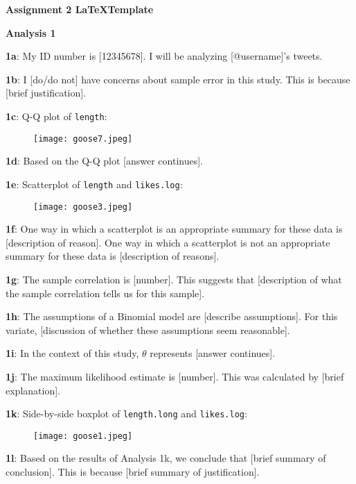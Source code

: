 \documentclass[a4paper,12pt]{article}
\begin{document}
\textbf{Assignment 2 \LaTeX Template}\bigskip

\textbf{Analysis 1}\bigskip

\textbf{1a}: My ID number is [12345678]. I will be analyzing [@username]'s tweets.\bigskip

\textbf{1b}: I [do/do not] have concerns about sample error in this study. This is because [brief justification].\bigskip

\textbf{1c}: Q-Q plot of \texttt{length}:

\begin{figure}[H]
     \centering
     \texttt{[image: goose7.jpeg]}
\end{figure}

\textbf{1d}: Based on the Q-Q plot [answer continues].\bigskip

\textbf{1e}: Scatterplot of \texttt{length} and \texttt{likes.log}:

\begin{figure}[H]
     \centering
     \texttt{[image: goose3.jpeg]}
\end{figure}

\textbf{1f}: One way in which a scatterplot is an appropriate summary for these data is [description of reason]. One way in which a scatterplot is not an appropriate summary for these data is [description of reasons].\bigskip

\textbf{1g}: The sample correlation is [number]. This suggests that [description of what the sample correlation tells us for this sample].\bigskip

\newpage

\textbf{1h}: The assumptions of a Binomial model are [describe assumptions]. For this variate, [discussion of whether these assumptions seem reasonable].\bigskip

\textbf{1i}: In the context of this study, $\theta$ represents [answer continues].\bigskip

\textbf{1j}: The maximum likelihood estimate is [number]. This was calculated by [brief explanation].\bigskip

\textbf{1k}: Side-by-side boxplot of \texttt{length.long} and \texttt{likes.log}:


\begin{figure}[H]
     \centering
     \texttt{[image: goose1.jpeg]}
\end{figure}

\textbf{1l}: Based on the results of Analysis 1k, we conclude that [brief summary of conclusion]. This is because [brief summary of justification].
\end{document}
